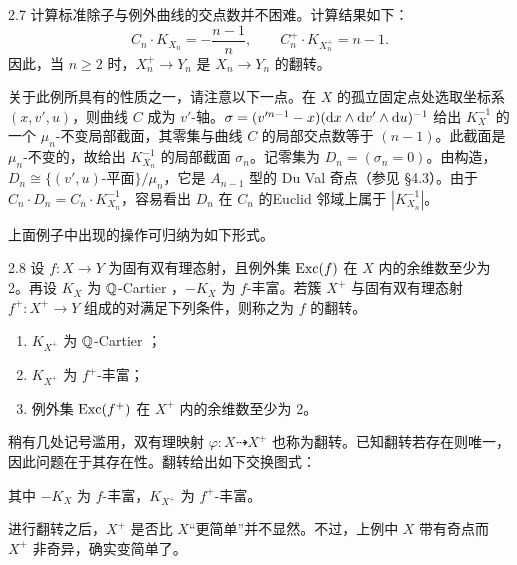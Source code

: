 \begin{example}{2.7}
计算标准除子与例外曲线的交点数并不困难。计算结果如下：
\[
C_n\cdot K_{X_n}=-\frac{n-1}{n},\qquad C_n^+\cdot K_{X_n^+}=n-1.
\]
因此，当 $n\ge 2$ 时，$X^+_n\to Y_n$ 是 $X_n\to Y_n$ 的翻转。

关于此例所具有的性质之一，请注意以下一点。在 $X$ 的孤立固定点处选取坐标系 $(x,v',u)$，则曲线 $C$ 成为 $v'$-轴。$\sigma=(v'^{n-1}-x)(\mathrm{d} x\wedge\mathrm{d} v'\wedge\mathrm{d} u)^{-1}$ 给出 $K_X^{-1}$ 的一个 $\mu_n$-不变局部截面，其零集与曲线 $C$ 的局部交点数等于 $(n-1)$。此截面是 $\mu_n$-不变的，故给出 $K_{X_n}^{-1}$ 的局部截面 $\sigma_n$。记零集为 $D_n=(\sigma_n=0)$。由构造，$D_n\cong\{(v',u)\text{-平面}\}/\mu_n$，它是 $A_{n-1}$ 型的 Du Val 奇点（参见 §4.3）。由于 $C_n\cdot D_n=C_n\cdot K_{X_n}^{-1}$，容易看出 $D_n$ 在 $C_n$ 的Euclid 邻域上属于 $|K_{X_n}^{-1}|$。
\end{example}

上面例子中出现的操作可归纳为如下形式。

\begin{definition}{2.8}
设 $f\colon X\to Y$ 为固有双有理态射，且例外集 $\operatorname{Exc}(f)$ 在 $X$ 内的余维数至少为 2。再设 $K_X$ 为 $\mathbb{Q}$-Cartier ，$-K_X$ 为 $f$-丰富。若簇 $X^+$ 与固有双有理态射 $f^+\colon X^+\to Y$ 组成的对满足下列条件，则称之为 $f$ 的翻转。
\begin{enumerate}[label=（\arabic*）,leftmargin=2.6em,itemsep=1pt]
\item $K_{X^+}$ 为 $\mathbb{Q}$-Cartier ；
\item $K_{X^+}$ 为 $f^+$-丰富；
\item 例外集 $\operatorname{Exc}(f^+)$ 在 $X^+$ 内的余维数至少为 2。
\end{enumerate}

稍有几处记号滥用，双有理映射 $\varphi\colon X\dashrightarrow X^+$ 也称为翻转。已知翻转若存在则唯一，因此问题在于其存在性。翻转给出如下交换图式：

\begin{center}
\end{center}
其中 $-K_X$ 为 $f$-丰富，$K_{X^{+}}$ 为 $f^{+}$-丰富。
\end{definition}

进行翻转之后，$X^+$ 是否比 $X$“更简单”并不显然。不过，上例中 $X$ 带有奇点而 $X^+$ 非奇异，确实变简单了。

